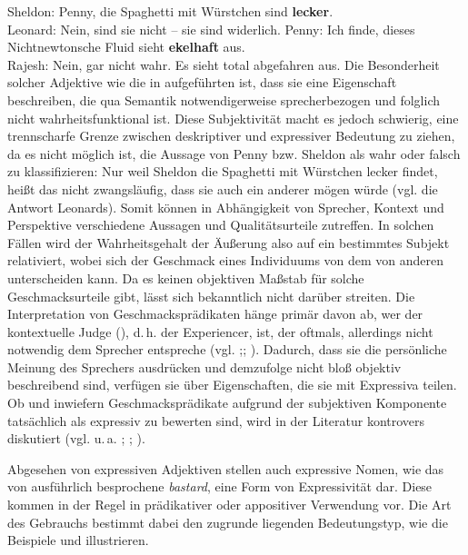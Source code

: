 \ea  \label{ExAd2}
\ea Sheldon: \glqq{}Penny, die Spaghetti mit Würstchen sind \textbf{lecker}.\grqq{} \\
Leonard: \glqq{}Nein, sind sie nicht -- sie sind widerlich.\grqq{}
\ex Penny: \glqq{}Ich finde, dieses Nichtnewtonsche Fluid sieht \textbf{ekelhaft} aus.\grqq{} \\
Rajesh: \glqq{}Nein, gar nicht wahr. Es sieht total abgefahren aus.\grqq{}
 \z
 \z
Die Besonderheit solcher Adjektive wie die in  aufgeführten ist, dass sie eine Eigenschaft beschreiben, die qua Semantik notwendigerweise sprecherbezogen und folglich nicht wahrheitsfunktional ist. Diese Subjektivität macht es jedoch schwierig, eine trennscharfe Grenze zwischen deskriptiver und expressiver Bedeutung zu ziehen, da es nicht möglich ist, die Aussage von Penny bzw. Sheldon als wahr oder falsch zu klassifizieren: Nur weil Sheldon die Spaghetti mit Würstchen lecker findet, heißt das nicht zwangsläufig, dass sie auch ein anderer mögen würde (vgl. die Antwort Leonards). Somit können in Abhängigkeit von Sprecher, Kontext und Perspektive verschiedene Aussagen und Qualitätsurteile zutreffen. In solchen Fällen wird der Wahrheitsgehalt der Äußerung also auf ein bestimmtes Subjekt relativiert, wobei sich der Geschmack eines Individuums von dem von anderen unterscheiden kann. Da es keinen objektiven Maßstab für solche Geschmacksurteile gibt, lässt sich bekanntlich nicht darüber streiten. Die Interpretation von Geschmacksprädikaten hänge primär davon ab, wer der kontextuelle \glqq{}Judge\grqq{} ({\citealt[665]{Lasersohn.2005}}), d.\,h. der Experiencer, ist, der oftmals, allerdings nicht notwendig dem Sprecher entspreche (vgl. \citealt[325f.]{Kaiser.2017b};; \citealt[224f.]{Kaiser.2017a}). Dadurch, dass sie die persönliche Meinung des Sprechers ausdrücken und demzufolge nicht bloß objektiv beschreibend sind, verfügen sie über Eigenschaften, die sie mit Expressiva teilen. Ob und inwiefern Geschmacksprädikate aufgrund der subjektiven Komponente tatsächlich als expressiv zu bewerten sind, wird in der Literatur kontrovers diskutiert (vgl. u.\,a. \citealt[]{Lasersohn.2005}; \citealt[]{Harris.2009}; \citealt[]{Gutzmann.2016a}).



Abgesehen von expressiven Adjektiven stellen auch expressive Nomen, wie das von \citet[168]{Potts.2007b} ausführlich besprochene \textit{bastard}, eine Form von Expressivität dar. Diese kommen in der Regel in prädikativer oder appositiver Verwendung vor. Die Art des Gebrauchs bestimmt dabei den zugrunde liegenden Bedeutungstyp, wie die Beispiele  und  illustrieren.

